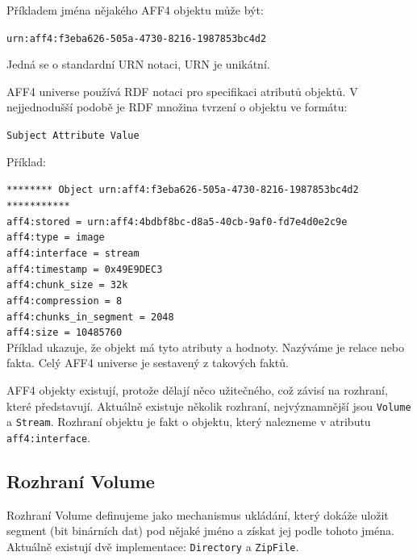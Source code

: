 \vspace{0.5cm}

\noindent Příkladem jména nějakého AFF4 objektu může být:

\texttt{urn:aff4:f3eba626-505a-4730-8216-1987853bc4d2}

\noindent Jedná se o standardní URN notaci, URN je unikátní.

\vspace{0.5cm}

\noindent AFF4 universe používá RDF notaci pro specifikaci atributů objektů. V nejjednodušší podobě je RDF množina tvrzení o objektu ve formátu:

\texttt{Subject   Attribute   Value}

\vspace{0.5cm}

\noindent Příklad:

\noindent \texttt{******** Object urn:aff4:f3eba626-505a-4730-8216-1987853bc4d2 ***********}\\
\texttt{aff4:stored = urn:aff4:4bdbf8bc-d8a5-40cb-9af0-fd7e4d0e2c9e}\\
\texttt{aff4:type = image}\\
\texttt{aff4:interface = stream}\\
\texttt{aff4:timestamp = 0x49E9DEC3}\\
\texttt{aff4:chunk\_size = 32k}\\
\texttt{aff4:compression = 8}\\
\texttt{aff4:chunks\_in\_segment = 2048}\\
\texttt{aff4:size = 10485760}\\

\noindent Příklad ukazuje, že objekt má tyto atributy a hodnoty. Nazýváme je relace nebo fakta. Celý AFF4 universe je sestavený z takových faktů.

\noindent AFF4 objekty existují, protože dělají něco užitečného, což závisí na rozhraní, které představují. Aktuálně existuje několik rozhraní, nejvýznamnější jsou \texttt{Volume} a \texttt{Stream}. Rozhraní objektu je fakt o objektu, který nalezneme v atributu \texttt{aff4:interface}.

\subsection{Rozhraní Volume}
Rozhraní Volume definujeme jako mechanismus ukládání, který dokáže uložit segment (bit binárních dat) pod nějaké jméno a získat jej podle tohoto jména. Aktuálně existují dvě implementace: \texttt{Directory} a \texttt{ZipFile}.


